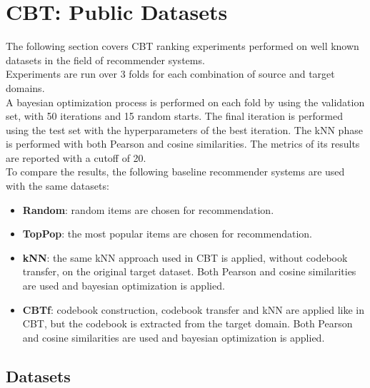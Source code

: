 \clearpage



\section{CBT: Public Datasets}

The following section covers CBT ranking experiments performed on well known datasets in the field of recommender systems.\\
Experiments are run over 3 folds for each combination of source and target domains.\\
A bayesian optimization process is performed on each fold by using the validation set, with 50 iterations and 15 random starts. The final iteration is performed using the test set with the hyperparameters of the best iteration. The kNN phase is performed with both Pearson and cosine similarities. The metrics of its results are reported with a cutoff of 20.\\
To compare the results, the following baseline recommender systems are used with the same datasets:
\begin{itemize}
\item \textbf{Random}: random items are chosen for recommendation.
\item \textbf{TopPop}: the most popular items are chosen for recommendation.
\item \textbf{kNN}: the same kNN approach used in CBT is applied, without codebook transfer, on the original target dataset. Both Pearson and cosine similarities are used and bayesian optimization is applied.
\item \textbf{CBTf}: codebook construction, codebook transfer and kNN are applied like in CBT, but the codebook is extracted from the target domain. Both Pearson and cosine similarities are used and bayesian optimization is applied.
\end{itemize}


\subsection{Datasets}

